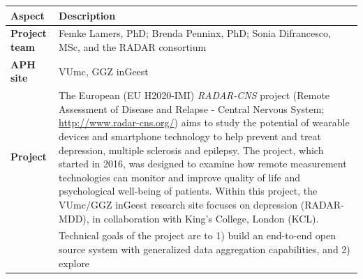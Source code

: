 \documentclass[]{book}
\begin{document}
\begin{longtable}[]{@{}ll@{}}
\toprule
\begin{minipage}[b]{0.25\columnwidth}\raggedright\strut
\textbf{Aspect}\strut
\end{minipage} & \begin{minipage}[b]{0.69\columnwidth}\raggedright\strut
\textbf{Description}\strut
\end{minipage}\tabularnewline
\midrule
\endhead
\begin{minipage}[t]{0.25\columnwidth}\raggedright\strut
\textbf{Project team}\strut
\end{minipage} & \begin{minipage}[t]{0.69\columnwidth}\raggedright\strut
Femke Lamers, PhD; Brenda Penninx, PhD; Sonia Difrancesco, MSc, and the
RADAR consortium\strut
\end{minipage}\tabularnewline
\begin{minipage}[t]{0.25\columnwidth}\raggedright\strut
\textbf{APH site}\strut
\end{minipage} & \begin{minipage}[t]{0.69\columnwidth}\raggedright\strut
VUmc, GGZ inGeest\strut
\end{minipage}\tabularnewline
\begin{minipage}[t]{0.25\columnwidth}\raggedright\strut
\textbf{Project}\strut
\end{minipage} & \begin{minipage}[t]{0.69\columnwidth}\raggedright\strut
The European (EU H2020-IMI) \emph{RADAR-CNS} project (Remote Assessment
of Disease and Relapse - Central Nervous System;
\url{http://www.radar-cns.org/}) aims to study the potential of wearable
devices and smartphone technology to help prevent and treat depression,
multiple sclerosis and epilepsy. The project, which started in 2016, was
designed to examine how remote measurement technologies can monitor and
improve quality of life and psychological well-being of patients. Within
this project, the VUmc/GGZ inGeest research site focuses on depression
(RADAR-MDD), in collaboration with King's College, London (KCL).\strut
\end{minipage}\tabularnewline
\begin{minipage}[t]{0.25\columnwidth}\raggedright\strut
\strut
\end{minipage} & \begin{minipage}[t]{0.69\columnwidth}\raggedright\strut
Technical goals of the project are to 1) build an end-to-end open source
system with generalized data aggregation capabilities, and 2) explore

\end{minipage}
\end{longtable}
\end{document}
